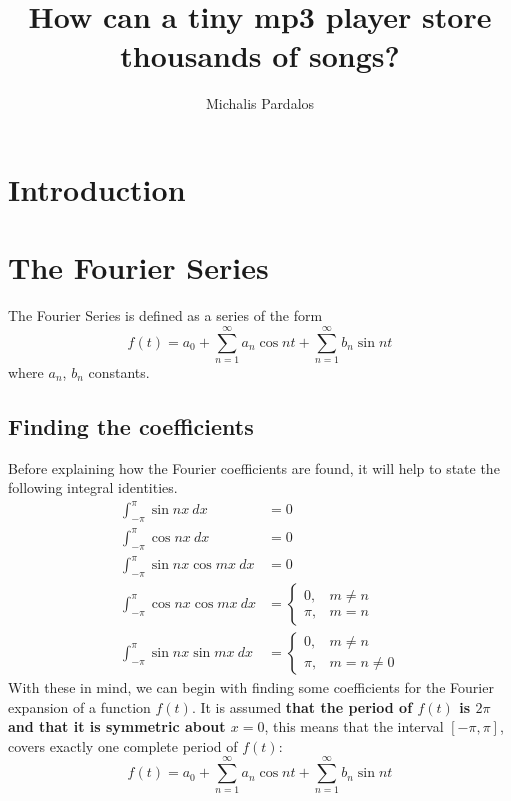 \documentclass [12pt, titlepage]{article}
\title{How can a tiny mp3 player store thousands of songs?}
\author{Michalis Pardalos}
\date{}
\numberwithin{equation}{section}
\let\oldsection\section
\renewcommand\section{\clearpage\oldsection}
\newcommand{\piint}{\int_{-\pi}^{\pi}} %
\begin{document}
\maketitle
\tableofcontents

\section{Introduction}
\section{The Fourier Series}

The Fourier Series is defined as a series of the form
%
\begin{equation} \label{eq:fourier_series}
    f(t) = a_0 + \sum_{n=1}^{\infty}a_n \cos{nt} + \sum_{n=1}^{\infty}b_n \sin{nt}
\end{equation}
%
where $a_n$, $b_n$ constants. 

\subsection{Finding the coefficients} \label{sec:fourier_coefficients}

Before explaining how the Fourier coefficients are found, it will help to state the
following integral identities\autocite[438]{courant_calculus_1}.
%
\begin{align}
    \piint \sin{nx}\ dx          & = 0 \label{eq:sinint}\\
    \piint \cos{nx}\ dx          & = 0 \label{eq:cosint}\\
    \piint \sin{nx}\cos{mx}\ dx & = 0\label{eq:sincosint}\\
    \piint \cos{nx}\cos{mx}\ dx & =
    \begin{cases}
        0,   & m\not=n\\
        \pi, & m=n
    \end{cases} \label{eq:coscosint}\\
    \piint \sin{nx}\sin{mx}\ dx &= 
    \begin{cases}
        0,   & m\not=n\\
        \pi, & m=n\not=0
    \end{cases} \label{eq:sinsinint}
\end{align}
%
With these in mind, we can begin with finding some coefficients for the Fourier expansion of
a function $f(t)$. It is assumed \textbf{that the period of $f(t)$ is
$2\pi$ and that it is symmetric about $x=0$}, this means that the interval $[-\pi, \pi]$,
covers exactly one complete period of $f(t)$:
%
\begin{equation*}
    f(t) = a_0 + \sum_{n=1}^\infty a_n \cos{nt} + \sum_{n=1}^{\infty} b_n \sin{nt}
\end{equation*}
%
\end{document}
